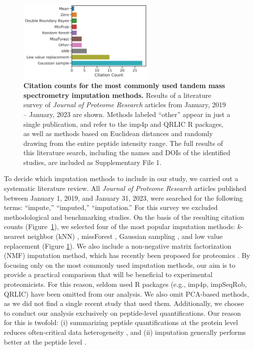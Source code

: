 \documentclass{article}
\begin{document}
\begin{figure}
  \begin{center}
    \includegraphics[width=0.6\textwidth]{figures/imp-lit-seq-results-update1.png}
  \end{center}
  \caption{{\bf Citation counts for the most commonly used tandem mass spectrometry imputation methods.} Results of a literature survey of \textit{Journal of Proteome Research} articles from January, 2019 -- January, 2023 are shown. Methods labeled ``other'' appear in just a single publication, and refer to the imp4p and QRLIC R packages, as well as methods based on Euclidean distances and randomly drawing from the entire peptide intensity range.  The full results of this literature search, including the names and DOIs of the identified studies, are included as Supplementary File 1. }
  \label{fig:citation-counts}
\end{figure} 

To decide which imputation methods to include in our study, we carried out a systematic literature review.  All \textit{Journal of Proteome Research} articles published between January 1, 2019, and January 31, 2023, were searched for the following terms: ``impute,'' ``imputed,'' ``imputation.'' For this survey we excluded methodological and benchmarking studies.  On the basis of the resulting citation counts (Figure~\ref{fig:citation-counts}), we selected four of the most popular imputation methods: $k$-nearest neighbor (kNN)  \cite{knn-impute}, missForest \cite{missForest}, Gaussian sampling \cite{Perseus}, and low value replacement (Figure \ref{fig:citation-counts}).   We also include a non-negative matrix factorization (NMF) imputation method, which has recently been proposed for proteomics \cite{nmf-metabolomics, ms-impute, deep-impute}.  By focusing only on the most commonly used imputation methods, our aim is to provide a practical comparison that will be beneficial to experimental proteomicists. For this reason, seldom used R packages (e.g., imp4p, impSeqRob, QRLIC) have been omitted from our analysis. We also omit PCA-based methods, as we did not find a single recent study that used them. Additionally, we choose to conduct our analysis exclusively on peptide-level quantifications. Our reason for this is twofold: (i) summarizing peptide quantifications at the protein level reduces often-critical data heterogeneity \cite{humpty-dumpty}, and (ii) imputation generally performs better at the peptide level \cite{lazar}.
\end{document}
